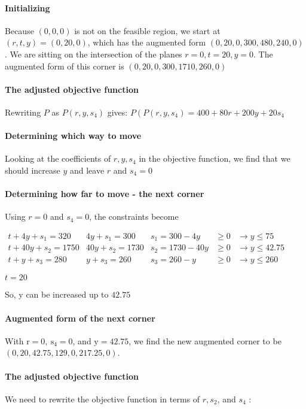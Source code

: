 \paragraph{Initializing}
Because $(0,0,0)$ is not on the feasible region, we start at $(r, t, y)=(0,20,0)$, which has the augmented form $(0,20,0,300,480,240,0)$. We are sitting on the intersection of the planes $r=0, t=20, y=0$. The augmented form of this corner is $(0,20,0,300,1710,260,0)$

\paragraph{The adjusted objective function}
Rewriting $P$ as $P\left(r, y, s_{4}\right)$ gives: $P\left(P\left(r, y, s_{4}\right)=400+80 r+200 y+20 s_{4}\right.$

\paragraph{Determining which way to move}
Looking at the coefficients of $r, y, s_{4}$ in the objective function, we find that we should increase $y$ and leave $r$ and $s_{4}=0$

\paragraph{Determining how far to move - the next corner}
Using $r=0$ and $s_{4}=0$, the constraints become

$\begin{array}{lllll}t+4 y+s_{1}=320 & 4 y+s_{1}=300 & s_{1}=300-4 y & \geq 0 & \rightarrow y \leq 75 \\ t+40 y+s_{2}=1750 & 40 y+s_{2}=1730 & s_{2}=1730-40 y & \geq 0 & \rightarrow y \leq 42.75 \\ t+y+s_{3}=280 & y+s_{3}=260 & s_{3}=260-y & \geq 0 & \rightarrow y \leq 260\end{array}$

$t=20$

So, y can be increased up to $42.75$

\paragraph{Augmented form of the next corner}
With $\mathrm{r}=0, \mathrm{~s}_{4}=0$, and $\mathrm{y}=42.75$, we find the new augmented corner to be $(0,20,42.75,129,0,217.25,0)$.

\paragraph{The adjusted objective function}
We need to rewrite the objective function in terms of $r, s_{2}$, and $s_{4}$ :

